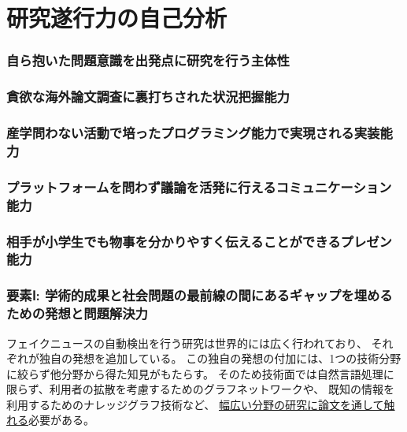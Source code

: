
\section{研究遂行力の自己分析}

\noindent
{}
\subsubsection*{自ら抱いた問題意識を出発点に研究を行う主体性}

\subsubsection*{貪欲な海外論文調査に裏打ちされた状況把握能力}

\subsubsection*{産学問わない活動で培ったプログラミング能力で実現される実装能力}

\subsubsection*{プラットフォームを問わず議論を活発に行えるコミュニケーション能力}

\subsubsection*{相手が小学生でも物事を分かりやすく伝えることができるプレゼン能力}

\vspace{5mm}
\noindent
{}
\vspace{-5mm}
\subsubsection*{要素Ⅰ: 学術的成果と社会問題の最前線の間にあるギャップを埋めるための発想と問題解決力}
フェイクニュースの自動検出を行う研究は世界的には広く行われており、
それぞれが独自の発想を追加している。
この独自の発想の付加には、1つの技術分野に絞らず他分野から得た知見がもたらす。
そのため技術面では自然言語処理に限らず、利用者の拡散を考慮するためのグラフネットワークや、
既知の情報を利用するためのナレッジグラフ技術など、
\underline{幅広い分野の研究に論文を通して触れる}必要がある。

